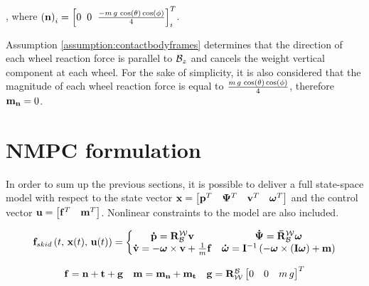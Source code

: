 \noindent , where $\left( \mathbf{n} \right)_i = \left[0 \;\; 0 \;\; \frac{-m\,g\,\cos(\theta) \cos(\phi)}{4} \right]^T_i$.

\begin{assumption}
Assumption \ref{assumption:contactbodyframes} determines that the direction of each wheel reaction force is parallel to $\mathcal{B}_z$ and cancels the weight vertical component at each wheel. For the sake of simplicity, it is also considered that the magnitude of each wheel reaction force is equal to $\frac{m\,g\,\cos(\theta) \cos(\phi)}{4}$, therefore $\mathbf{m}_{\mathbf{n}} = 0$.
\label{eq:reactionforcessimplification}
\end{assumption}
\section{NMPC formulation}
\label{section:fullStateSpace}

In order to sum up the previous sections, it is possible to deliver a full state-space model with respect to the state vector $\mathbf{x} = \begin{bmatrix}
\mathbf{\Position}^T & \bm{\Orientation}^T & \mathbf{\LinVelocity}^T & \bm{\AngVelocity}^T
\end{bmatrix}$ and the control vector $\mathbf{u} = \begin{bmatrix}
\mathbf{f}^T & \mathbf{m}^T
\end{bmatrix}$. Nonlinear constraints to the model are also included.

\begin{equation}
	\mathbf{f}_{skid}\left( t, \,\mathbf{x}(t),\, \mathbf{u}(t) \right) = \left\{\begin{matrix}
		\DerMathBold{\Position} = \mathbf{\RotMatrix}_{\BodyFrame}^{\WorldFrame} \mathbf{\LinVelocity} & \DerBold{\Orientation} = \mathbf{\bar{\RotMatrix}}_{\BodyFrame}^{\WorldFrame} \bm{\AngVelocity} \\
		\mathbf{\dot{\LinVelocity}} = -\bm{\AngVelocity} \times \mathbf{\LinVelocity} + \frac{1}{\Mass} \mathbf{\Force} & \bm{ \dot{\AngVelocity} } = \mathbf{\InertiaTensor}^{-1} \left( -\bm{\AngVelocity} \times \left( \mathbf{\InertiaTensor} \bm{\AngVelocity} \right) + \mathbf{\Moment}\right)
	\end{matrix}\right.
	\label{eq:fullStateSpace}
\end{equation}

\begin{equation}
	\begin{matrix} \mathbf{f} = \mathbf{n} + \mathbf{t} + \mathbf{g} & \mathbf{m} = \mathbf{m_n} + \mathbf{m}_{\mathbf{t}} & \mathbf{g} = \mathbf{R}_{\mathcal{W}}^{\mathcal{B}} \begin{bmatrix} 0 & 0 & m\,g\end{bmatrix}^T \end{matrix}
	\label{eq:sumMomentsForces}
\end{equation}


